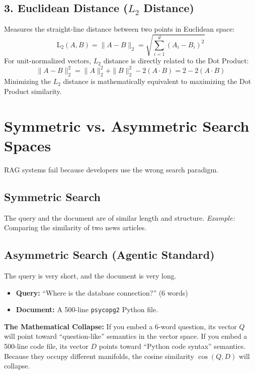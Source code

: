 \subsection{3. Euclidean Distance ($L_2$ Distance)}
Measures the straight-line distance between two points in Euclidean space:
\begin{equation}
\text{L}_2(A, B) = \|A - B\|_2 = \sqrt{\sum_{i=1}^d (A_i - B_i)^2}
\end{equation}
For unit-normalized vectors, $L_2$ distance is directly related to the Dot Product:
\begin{equation}
\|A - B\|_2^2 = \|A\|_2^2 + \|B\|_2^2 - 2(A \cdot B) = 2 - 2(A \cdot B)
\end{equation}
Minimizing the $L_2$ distance is mathematically equivalent to maximizing the Dot Product similarity.

\section{Symmetric vs. Asymmetric Search Spaces}

RAG systems fail because developers use the wrong search paradigm.

\subsection{Symmetric Search}
The query and the document are of similar length and structure.
\textit{Example:} Comparing the similarity of two news articles.

\subsection{Asymmetric Search (Agentic Standard)}
The query is very short, and the document is very long.
\begin{itemize}
    \item \textbf{Query:} ``Where is the database connection?'' (6 words)
    \item \textbf{Document:} A 500-line \texttt{psycopg2} Python file.
\end{itemize}

\textbf{The Mathematical Collapse:} If you embed a 6-word question, its vector $Q$ will point toward ``question-like'' semantics in the vector space. If you embed a 500-line code file, its vector $D$ points toward ``Python code syntax'' semantics. Because they occupy different manifolds, the cosine similarity $\cos(Q, D)$ will collapse.

